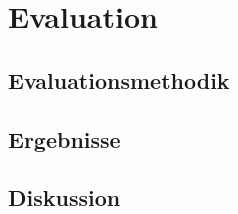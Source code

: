 \chapter{Evaluation}\label{ch:evaluation}


\section{Evaluationsmethodik}


\section{Ergebnisse}


\section{Diskussion}





